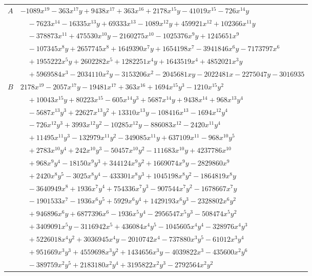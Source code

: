 \documentclass[11pt]{article}
\begin{document}
\begin{longtable}{@{}ll@{}}
$A$ & $-1089x^{19}-363x^{17}y+9438x^{17}+363x^{16}+2178x^{15}y-41019x^{15}-726x^{14}y$\\
 & $\quad -7623x^{14}-16335x^{13}y+69333x^{13}-1089x^{12}y+459921x^{12}+102366x^{11}y$\\
 & $\quad -378873x^{11}+475530x^{10}y-2160275x^{10}-1025376x^{9}y+1245651x^{9}$\\
 & $\quad -107345x^{8}y+2657745x^{8}+1649390x^{7}y+1654198x^{7}-3941846x^{6}y-7173797x^{6}$\\
 & $\quad +1955222x^{5}y+2602282x^{5}+1282251x^{4}y+1643519x^{4}+4852021x^{3}y$\\
 & $\quad +5969584x^{3}-2034110x^{2}y-3153206x^{2}-2045681xy-2022481x-2275047y-3016935$\\
$B$ & $2178x^{19}-2057x^{17}y-19481x^{17}+363x^{16}+1694x^{15}y^{3}-1210x^{15}y^{2}$\\
 & $\quad +10043x^{15}y+80223x^{15}-605x^{14}y^{3}+5687x^{14}y+9438x^{14}+968x^{13}y^{4}$\\
 & $\quad -5687x^{13}y^{3}+22627x^{13}y^{2}+13310x^{13}y-108416x^{13}-1694x^{12}y^{4}$\\
 & $\quad -726x^{12}y^{3}+3993x^{12}y^{2}-10285x^{12}y-886083x^{12}-2420x^{11}y^{4}$\\
 & $\quad +11495x^{11}y^{3}-132979x^{11}y^{2}-349085x^{11}y+637109x^{11}-968x^{10}y^{5}$\\
 & $\quad +2783x^{10}y^{4}+242x^{10}y^{3}-50457x^{10}y^{2}-111683x^{10}y+4237786x^{10}$\\
 & $\quad +968x^{9}y^{4}-18150x^{9}y^{3}+344124x^{9}y^{2}+1669074x^{9}y-2829860x^{9}$\\
 & $\quad +2420x^{8}y^{5}-3025x^{8}y^{4}-433301x^{8}y^{3}+1045198x^{8}y^{2}-1864819x^{8}y$\\
 & $\quad -3640949x^{8}+1936x^{7}y^{4}+754336x^{7}y^{3}-907544x^{7}y^{2}-1678667x^{7}y$\\
 & $\quad -1901533x^{7}-1936x^{6}y^{5}+5929x^{6}y^{4}+1429193x^{6}y^{3}-2328802x^{6}y^{2}$\\
 & $\quad +946896x^{6}y+6877396x^{6}-1936x^{5}y^{4}-2956547x^{5}y^{3}-508474x^{5}y^{2}$\\
 & $\quad +3409091x^{5}y-3116942x^{5}+436084x^{4}y^{5}-1045605x^{4}y^{4}-328976x^{4}y^{3}$\\
 & $\quad +5226018x^{4}y^{2}+3036945x^{4}y-2010742x^{4}-737880x^{3}y^{5}-61012x^{3}y^{4}$\\
 & $\quad +951669x^{3}y^{3}+4559698x^{3}y^{2}+1434656x^{3}y-4039822x^{3}-435600x^{2}y^{6}$\\
 & $\quad -389759x^{2}y^{5}+2183180x^{2}y^{4}+3195822x^{2}y^{3}-2792564x^{2}y^{2}$\\

\end{longtable}
\end{document}
